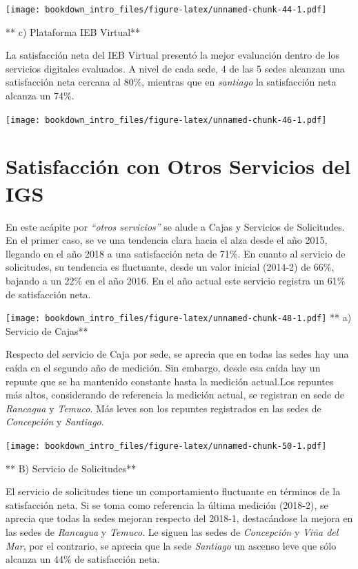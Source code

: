 \documentclass[]{book}
\begin{document}
\texttt{[image: bookdown\_intro\_files/figure-latex/unnamed-chunk-44-1.pdf]}

** c) Plataforma IEB Virtual**

La satisfacción neta del IEB Virtual presentó la mejor evaluación dentro
de los servicios digitales evaluados. A nivel de cada sede, 4 de las 5
sedes alcanzan una satisfacción neta cercana al 80\%, mientras que en
\emph{santiago} la satisfacción neta alcanza un 74\%.

\texttt{[image: bookdown\_intro\_files/figure-latex/unnamed-chunk-46-1.pdf]}

\section{Satisfacción con Otros Servicios del
IGS}\label{satisfaccion-con-otros-servicios-del-igs}

En este acápite por \emph{``otros servicios''} se alude a Cajas y
Servicios de Solicitudes. En el primer caso, se ve una tendencia clara
hacia el alza desde el año 2015, llegando en el año 2018 a una
satisfacción neta de 71\%. En cuanto al servicio de solicitudes, su
tendencia es fluctuante, desde un valor inicial (2014-2) de 66\%,
bajando a un 22\% en el año 2016. En el año actual este servicio
registra un 61\% de satisfacción neta.

\texttt{[image: bookdown\_intro\_files/figure-latex/unnamed-chunk-48-1.pdf]}
** a) Servicio de Cajas**

Respecto del servicio de Caja por sede, se aprecia que en todas las
sedes hay una caída en el segundo año de medición. Sin embargo, desde
esa caída hay un repunte que se ha mantenido constante hasta la medición
actual.Los repuntes más altos, considerando de referencia la medición
actual, se registran en sede de \emph{Rancagua} y \emph{Temuco}. Más
leves son los repuntes registrados en las sedes de \emph{Concepción} y
\emph{Santiago}.

\texttt{[image: bookdown\_intro\_files/figure-latex/unnamed-chunk-50-1.pdf]}

** B) Servicio de Solicitudes**

El servicio de solicitudes tiene un comportamiento fluctuante en
términos de la satisfacción neta. Si se toma como referencia la última
medición (2018-2), se aprecia que todas la sedes mejoran respecto del
2018-1, destacándose la mejora en las sedes de \emph{Rancagua} y
\emph{Temuco}. Le siguen las sedes de \emph{Concepción} y \emph{Viña del
Mar}, por el contrario, se aprecia que la sede \emph{Santiago} un
ascenso leve que sólo alcanza un 44\% de satisfacción neta.
\end{document}
